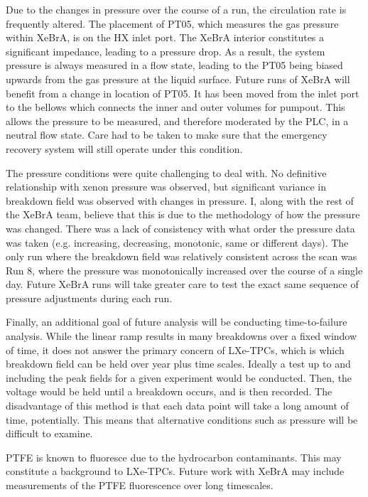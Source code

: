Due to the changes in pressure over the course of a run, the circulation rate is frequently altered.
The placement of PT05, which measures the gas pressure within XeBrA, is on the HX inlet port.
The XeBrA interior constitutes a significant impedance, leading to a pressure drop.
As a result, the system pressure is always measured in a flow state, leading to the PT05 being biased upwards from the gas pressure at the liquid surface.
Future runs of XeBrA will benefit from a change in location of PT05.
It has been moved from the inlet port to the bellows which connects the inner and outer volumes for pumpout.
This allows the pressure to be measured, and therefore moderated by the PLC, in a neutral flow state.
Care had to be taken to make sure that the emergency recovery system will still operate under this condition.

The pressure conditions were quite challenging to deal with. 
No definitive relationship with xenon pressure was observed, but significant variance in breakdown field was observed with changes in pressure.
I, along with the rest of the XeBrA team, believe that this is due to the methodology of how the pressure was changed.
There was a lack of consistency with what order the pressure data was taken (e.g. increasing, decreasing, monotonic, same or different days).
The only run where the breakdown field was relatively consistent across the scan was Run 8, where the pressure was monotonically increased over the course of a single day.
Future XeBrA runs will take greater care to test the exact same sequence of pressure adjustments during each run.

Finally, an additional goal of future analysis will be conducting time-to-failure analysis.
While the linear ramp results in many breakdowns over a fixed window of time, it does not answer the primary concern of LXe-TPCs, which is which breakdown field can be held over year plus time scales.
Ideally a test up to and including the peak fields for a given experiment would be conducted. 
Then, the voltage would be held until a breakdown occurs, and is then recorded.
The disadvantage of this method is that each data point will take a long amount of time, potentially.
This means that alternative conditions such as pressure will be difficult to examine.

PTFE is known to fluoresce\cite{shaw_ultraviolet_2007} due to the hydrocarbon contaminants.
This may constitute a background to LXe-TPCs. 
Future work with XeBrA may include measurements of the PTFE fluorescence over long timescales.